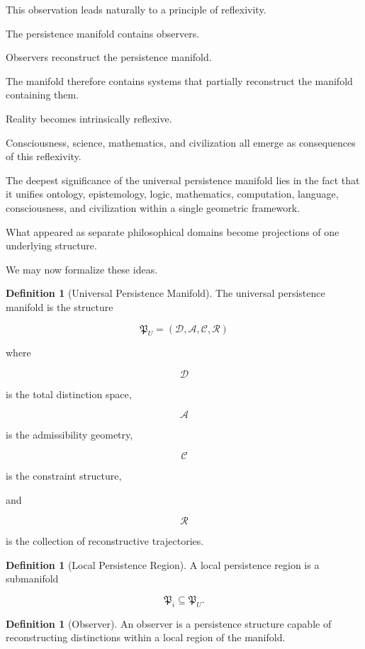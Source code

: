 \documentclass[12pt,oneside]{article}
\theoremstyle{definition}
\newtheorem{definition}[theorem]{Definition} \newtheorem{axiom}[theorem]{Axiom} \newtheorem{remark}[theorem]{Remark} \newtheorem{example}[theorem]{Example}
\begin{document}
This observation leads naturally to a principle of reflexivity.

The persistence manifold contains observers.

Observers reconstruct the persistence manifold.

The manifold therefore contains systems that partially reconstruct the manifold containing them.

Reality becomes intrinsically reflexive.

Consciousness, science, mathematics, and civilization all emerge as consequences of this reflexivity.

The deepest significance of the universal persistence manifold lies in the fact that it unifies ontology, epistemology, logic, mathematics, computation, language, consciousness, and civilization within a single geometric framework.

What appeared as separate philosophical domains become projections of one underlying structure.

We may now formalize these ideas.

\begin{definition}[Universal Persistence Manifold]

The universal persistence manifold is the structure

\[
\mathfrak P_U
=
(\mathcal D,
\mathcal A,
\mathcal C,
\mathcal R)
\]

where

\[
\mathcal D
\]

is the total distinction space,

\[
\mathcal A
\]

is the admissibility geometry,

\[
\mathcal C
\]

is the constraint structure,

and

\[
\mathcal R
\]

is the collection of reconstructive trajectories.

\end{definition}

\begin{definition}[Local Persistence Region]

A local persistence region is a submanifold

\[
\mathfrak P_i
\subseteq
\mathfrak P_U.
\]

\end{definition}

\begin{definition}[Observer]

An observer is a persistence structure capable of reconstructing distinctions within a local region of the manifold.

\end{definition}
\end{document}

